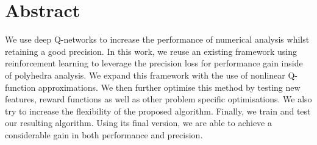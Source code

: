 
\chapter*{Abstract}
We use deep Q-networks to increase the performance of numerical analysis whilst retaining a good precision. In this work, we reuse an existing framework using reinforcement learning to leverage the precision loss for performance gain inside of polyhedra analysis. We expand this framework with the use of nonlinear Q-function approximations. We then further optimise this method by testing new features, reward functions as well as other problem specific optimisations. We also try to increase the flexibility of the proposed algorithm. Finally, we train and test our resulting algorithm. Using its final version, we are able to achieve a considerable gain in both performance and precision.

